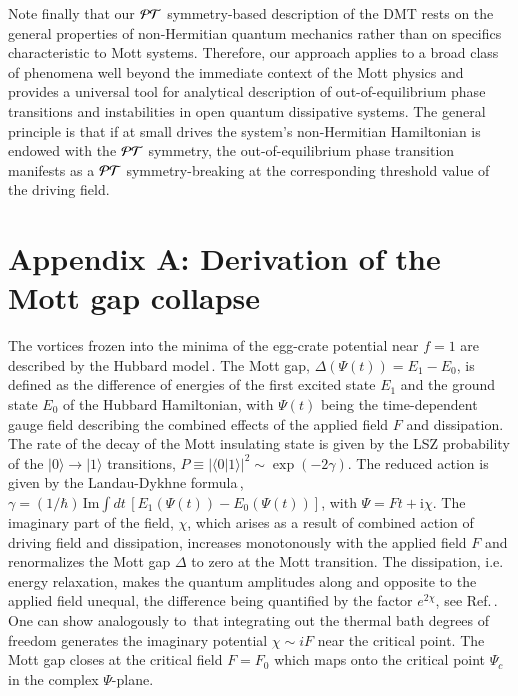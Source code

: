 \documentclass[aps,twocolumn,prl,10pt,amsmath,amssymb,nofootinbib,showpacs,superscriptaddress,floatfix]{revtex4-1}
\begin{document}
Note finally that our $\cal{PT}$ symmetry-based description of the DMT rests on the general properties of non-Hermitian quantum mechanics rather than on specifics characteristic to Mott systems.  
Therefore, our approach applies to a broad class of phenomena well beyond the immediate context of the Mott physics and
provides a universal tool for analytical description of out-of-equilibrium phase transitions and instabilities in open quantum dissipative systems. 
The general principle is that if at small drives the system's non-Hermitian Hamiltonian is endowed with the $\cal{PT}$ symmetry, the out-of-equilibrium phase transition manifests as a $\cal{PT}$ symmetry-breaking at the corresponding threshold
value of the driving field.

\section*{Appendix A: Derivation of the Mott gap collapse}
The vortices frozen into the minima of the egg-crate potential near $f=1$ are described by the Hubbard model\,\cite{Oka:2003,Oka:2010}. The Mott gap, $\Delta(\Psi(t))=E_{1}-E_{0}$, is defined as the difference of energies of the first excited state $E_1$ and the ground state $E_0$ of the Hubbard Hamiltonian, with $\Psi(t)$ being the time-dependent gauge field describing the combined effects of the 
 applied field $F$ and dissipation. The rate of the decay of the Mott insulating state is given by the LSZ probability of the $|0\rangle\to|1\rangle$ transitions, $P\equiv|\langle 0|1\rangle|^2\sim \exp(-2\gamma)$.
 The reduced action is
 given by the Landau-Dykhne formula\,\cite{Dykhne:1962},
 $\gamma =(1/\hbar)\,\text{Im}\int dt\, [E_{1}(\Psi(t))-E_{0}(\Psi(t))]$,
 with $\Psi=Ft+\mathrm{i}\chi$. The
 imaginary part of the field, $\chi$, which arises as a result of combined action of driving field and dissipation, increases monotonously  with the applied field $F$ and renormalizes the Mott gap $\Delta$ to zero at the Mott transition. 
The dissipation, i.e. energy relaxation, makes the quantum amplitudes along and opposite to the applied field unequal, the
 difference being quantified by the factor $e^{2\chi}$, see Ref.\,\cite{Nelson:1998}. 
 One can show analogously to\,\cite{Chtchelk:2009} that integrating out the thermal bath degrees of freedom generates the imaginary potential $\chi\sim iF$ near the critical point.
 The Mott gap closes at the critical field $F=F_0$ which maps onto the critical
  point $\Psi_c$ in the complex $\Psi$-plane.
\end{document}
